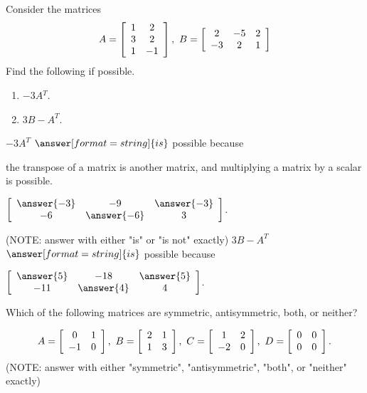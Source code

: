 \documentclass{ximera}
\author{Zack Reed}
\begin{document}
\begin{problem}
  Consider the matrices
  \begin{equation*}
    A = \startmat{cc}
      1 & 2 \\
      3 & 2 \\
      1 & -1
    \stopmat,
    \quad
    B = \startmat{ccc}
      2 & -5 & 2 \\
      -3 & 2 & 1
    \stopmat
  \end{equation*}
  Find the following if possible.
  \begin{enumerate}
  \item $-3A{^T}$.
  \item $3B - A^T$.
  \end{enumerate}

  $-3A^T$ $\answer[format=string]{is}$ possible because

  \begin{problem}
    the transpose of a matrix is another matrix, and multiplying a matrix by a scalar is possible.


$\startmat{ccc}
        \answer{-3} & -9 & \answer{-3} \\
        -6 & \answer{-6} & 3
      \stopmat$.
\end{problem}

(NOTE: answer with either "is" or "is not" exactly)
$3B - A^T$ $\answer[format=string]{is}$ possible because

  \begin{problem}
\begin{selectAll}
\end{selectAll}

$\startmat{ccc}
        \answer{5} & -18 & \answer{5} \\
        -11 & \answer{4} & 4
      \stopmat$.
      \end{problem}



  Which of the following matrices are symmetric, antisymmetric, both,
  or neither?

  \begin{equation*}
    A = \startmat{cc}
      0 & 1 \\
      -1 & 0
    \stopmat,
    \quad
    B = \startmat{cc}
      2 & 1 \\
      1 & 3
    \stopmat,
    \quad
    C = \startmat{cc}
      1 & 2 \\
      -2 & 0
    \stopmat,
    \quad
    D = \startmat{cc}
      0 & 0 \\
      0 & 0
    \stopmat.
  \end{equation*}
  (NOTE: answer with either "symmetric", "antisymmetric", "both", or "neither" exactly)


\end{problem}
\end{document}
